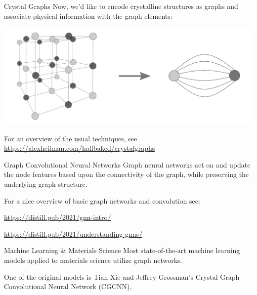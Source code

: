\documentclass[handout, 11pt]{beamer}
\begin{document}
\begin{frame}{Crystal Graphs}
Now, we'd like to encode crystalline structures as graphs and associate physical information with the graph elements:

\medskip

\begin{center}
\includegraphics[scale=0.3]{crystalgraphintro.pdf}
\end{center}

\medskip

For an overview of the usual techniques, see \url{https://alexheilman.com/halfbaked/crystalgraphs}
\end{frame}

\begin{frame}{Graph Convolutional Neural Networks}
Graph neural networks act on and update the node features based upon the connectivity of the graph, while preserving the underlying graph structure. 


\vspace{1cm}

For a nice overview of basic graph networks and convolution see: 

\url{https://distill.pub/2021/gnn-intro/}

\url{https://distill.pub/2021/understanding-gnns/}
\end{frame} 


\begin{frame}{Machine Learning \& Materials Science}
Most state-of-the-art machine learning models applied to materials science utilize graph networks.

\vspace{1cm}

One of the original models is Tian Xie and Jeffrey Grossman's Crystal Graph Convolutional Neural Network (CGCNN). 


\end{frame}
\end{document}
